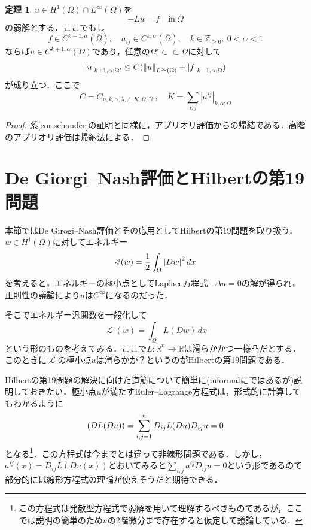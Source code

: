 \documentclass[a4paper]{ltjsarticle}
\newcommand{\Rset}{\mathbb{R}}
\newcommand{\Zset}{\mathbb{Z}}
\newcommand{\Om}{\Omega}
\newcommand{\Ombar}{\overline{\Omega}}
\newcommand{\ssubset}{\subset\subset}
\newcommand{\inn}{\quad\text{in}\ }
\newcommand{\1}{\mathbbm{1}}
\let\div\relax
\DeclareMathOperator{\div}{\mathrm{div}}
\numberwithin{equation}{section}
\theoremstyle{definition}
\newtheorem{thm}{定理}[section]
\begin{document}
\begin{thm}
    $u\in H^1(\Om)\cap L^\infty(\Om)$を 
    \begin{equation}
        -Lu=f\inn \Om 
    \end{equation}
    の弱解とする．ここでもし
    \begin{equation}
        f\in C^{k-1,\alpha}(\Ombar),\quad a_{ij}\in C^{k,\alpha}(\Ombar),\quad k\in\Zset_{\geq0},\ 0<\alpha<1 
    \end{equation}
    ならば$u\in C^{k+1,\alpha}(\Om)$であり，任意の$\Om'\ssubset \Om$に対して
    \begin{equation}
        \abs{u}_{k+1,\alpha;\Om'}\leq C(\norm{u}_{L^\infty(\Om)}+\abs{f}_{k-1,\alpha;\Om})
    \end{equation}
    が成り立つ．ここで
    \begin{equation}
        C=C_{n,k,\alpha,\lambda,\Lambda,K,\Om,\Om'},\quad K=\sum_{i,j}|a^{ij}|_{k,\alpha;\Om}
    \end{equation}
\end{thm}
\begin{proof}
    系\ref{cor:schauder}の証明と同様に，アプリオリ評価からの帰結である．高階のアプリオリ評価は帰納法による．
\end{proof}
\section{De Giorgi--Nash評価とHilbertの第19問題}
本節ではDe Girogi--Nash評価とその応用としてHilbertの第19問題を取り扱う．$w\in H^1(\Om)$に対してエネルギー
\begin{equation}
\mathop{\mathscr{E}}(w)=\frac{1}{2}\int_{\Om}\abs{Dw}^2\,dx 
\end{equation}
を考えると，エネルギーの極小点としてLaplace方程式$-\Delta u=0$の解が得られ，正則性の議論により$u$は$C^\infty$になるのだった．

そこでエネルギー汎関数を一般化して
\begin{equation}
    \mathop{\mathscr{L}}(w)=\int_{\Om} L(Dw)\,dx 
\end{equation}
という形のものを考えてみる．ここで$L\colon \Rset^n\to\Rset$は滑らかかつ一様凸だとする．このときに$\mathop{\mathscr{L}}$の極小点$u$は滑らかか？というのがHilbertの第19問題である．

Hilbertの第19問題の解決に向けた道筋について簡単に(informalにではあるが)説明しておきたい．極小点$u$が満たすEuler--Lagrange方程式は，形式的に計算してもわかるように
\begin{equation}
    \div(DL(Du))=\sum_{i,j=1}^n D_{ij}L(Du) D_{ij}u=0
\end{equation}
となる\footnote{この方程式は発散型方程式で弱解を用いて理解するべきものであるが，ここでは説明の簡単のため$u$の2階微分まで存在すると仮定して議論している．}．この方程式は今までとは違って非線形問題である．しかし，$a^{ij}(x)=D_{ij}L(Du(x))$とおいてみると$\sum_{i,j}a^{ij}D_{ij}u=0$という形であるので部分的には線形方程式の理論が使えそうだと期待できる．
\end{document}
